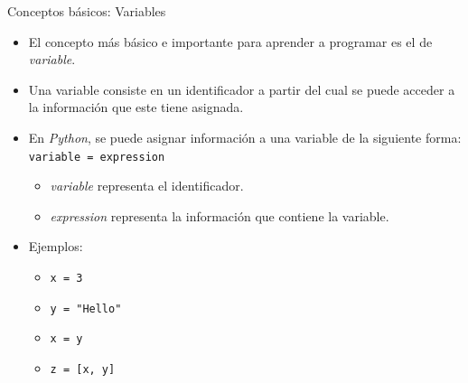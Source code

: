 \documentclass{beamer}
\begin{document}
    \begin{frame}{Conceptos básicos: Variables}
        \begin{itemize}
            \item El concepto más básico e importante para aprender a programar es el de \emph{variable}.
            \item Una variable consiste en un identificador a partir del cual se puede acceder a la información que este tiene asignada.
            \item En \emph{Python}, se puede asignar información a una variable de la siguiente forma: \texttt{variable = expression}
            \begin{itemize}
                \item \emph{variable} representa el identificador.
                \item \emph{expression} representa la información que contiene la variable.
            \end{itemize}
            \item Ejemplos:
            \begin{itemize}
                \item \texttt{x = 3}
                \item \texttt{y = "Hello"}
                \item \texttt{x = y}
                \item \texttt{z = [x, y]}
            \end{itemize}
        \end{itemize}
    \end{frame}
\end{document}
